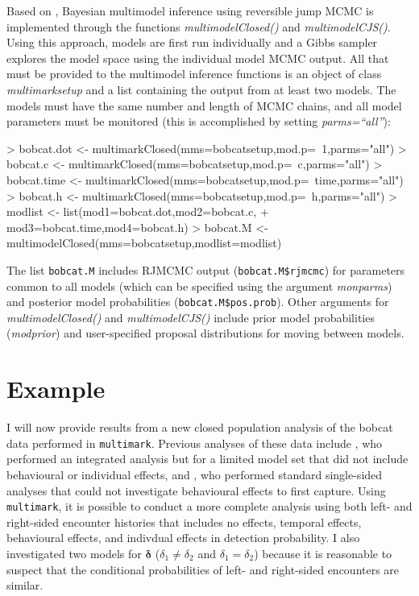 \documentclass[12pt]{article}
\begin{document}
Based on \cite{BarkerLink2013}, Bayesian multimodel inference using reversible jump MCMC is implemented through the functions \textit{multimodelClosed()} and \textit{multimodelCJS()}. Using this approach, models are first run individually and a Gibbs sampler explores the model space using the individual model MCMC output. All that must be provided to the multimodel inference functions is an object of class \textit{multimarksetup} and a list containing the output from at least two models. The models must have the same number and length of MCMC chains, and all model parameters must be monitored (this is accomplished by setting \textit{parms=``all''}):
\begin{Schunk}
\begin{Sinput}
> bobcat.dot <- multimarkClosed(mms=bobcatsetup,mod.p=~1,parms="all")
> bobcat.c <- multimarkClosed(mms=bobcatsetup,mod.p=~c,parms="all")
> bobcat.time <- multimarkClosed(mms=bobcatsetup,mod.p=~time,parms="all")
> bobcat.h <- multimarkClosed(mms=bobcatsetup,mod.p=~h,parms="all")
> modlist <- list(mod1=bobcat.dot,mod2=bobcat.c,
+                 mod3=bobcat.time,mod4=bobcat.h)
> bobcat.M <- multimodelClosed(mms=bobcatsetup,modlist=modlist)
\end{Sinput}
\end{Schunk}
The list \verb|bobcat.M| includes RJMCMC output (\verb|bobcat.M$rjmcmc|) for parameters common to all models (which can be specified using the argument \textit{monparms}) and posterior model probabilities (\verb|bobcat.M$pos.prob|). Other arguments for \textit{multimodelClosed()} and \textit{multimodelCJS()} include prior model probabilities (\textit{modprior}) and user-specified proposal distributions for moving between models.

\section{Example}
I will now provide results from a new closed population analysis of the bobcat data performed in \verb|multimark|. Previous analyses of these data include \cite{McClintockEtAl2013a}, who performed an integrated analysis but for a limited model set that did not include behavioural or individual effects, and \cite{AlonsoEtAl2015}, who performed standard single-sided analyses that could not investigate behavioural effects to first capture. Using \verb|multimark|, it is possible to conduct a more complete analysis using both left- and right-sided encounter histories that includes no effects, temporal effects, behavioural effects, and indivdual effects in detection probability. I also investigated two models for ${\boldsymbol \delta}$ ($\delta_1 \ne \delta_2$ and $\delta_1 = \delta_2$) because it is reasonable to suspect that the conditional probabilities of left- and right-sided encounters are similar. 
\end{document}

